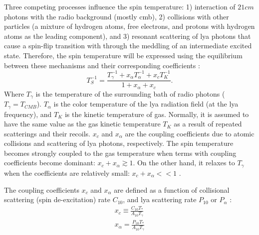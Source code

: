 \documentclass[12pt, TexShade, letterpaper]{report}
\begin{document}
Three competing processes influence the spin temperature: 1) interaction of $21cm$ photons with the radio background (mostly \gls{cmb}), 2) collisions with other particles (a mixture of hydrogen atoms, free electrons, and protons with hydrogen atoms as the leading component), and 3) resonant scattering of \gls{lya} photons that cause a spin-flip transition with through the meddling of an intermediate excited state. Therefore, the spin temperature will be expressed using the equilibrium between these mechanisms and their corresponding coefficients \cite{low_frequency,21century}:
\begin{equation}
    T^{-1}_S = \frac{T^{-1}_\gamma + x_\alpha T^{-1}_\alpha + x_c T^{-1}_K}{1 + x_\alpha + x_c}.
\end{equation}
Where $T_\gamma$ is the temperature of the surrounding bath of radio photons ($T_\gamma = T_{CMB}$). $T_\alpha$ is the color temperature of the \gls{lya} radiation field (at the \gls{lya} frequency), and $T_K$ is the kinetic temperature of gas. Normally, it is assumed to have the same value as the gas kinetic temperature $T_K$ as a result of repeated scatterings and their recoils. $x_c$ and $x_\alpha$ are the coupling coefficients due to atomic collisions and scattering of \gls{lya} photons, respectively. The spin temperature becomes strongly coupled to the gas temperature when terms with coupling coefficients become dominant: $x_c + x_\alpha \gtrsim 1$. On the other hand, it relaxes to $T_\gamma$ when the coefficients are relatively small: $x_c + x_\alpha << 1$ \cite{21century, low_frequency}. \par
The coupling coefficients $x_c$ and $x_\alpha$ are defined as a function of collisional scattering (spin de-excitation) rate $C_{10}$, and \gls{lya} scattering rate $P_{10}$ or $P_\alpha$ \cite{explore_cosmic_dawn, low_frequency}:
\begin{gather}
    x_c \equiv \frac{C_{10}T_*}{A_{10}T_\gamma}\\
    x_\alpha = \frac{P_{10} T_*}{A_{10}T_\gamma} \label{eq:x_a}
\end{gather}
\end{document}
